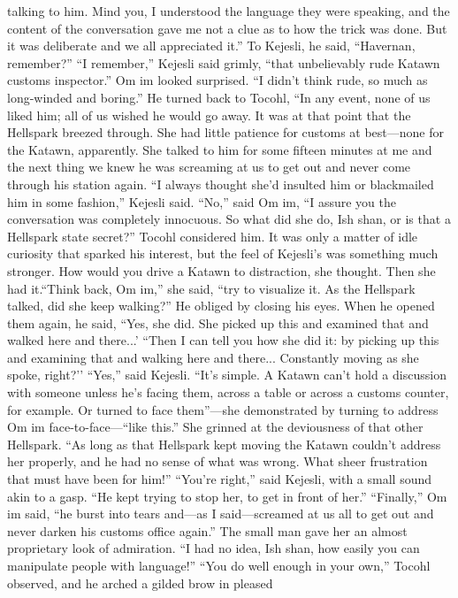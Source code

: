 \documentclass[9pt]{article}
\begin{document}
talking to him. Mind you, I understood the language they were speaking, and the content of the
conversation gave me not a clue as to how the trick was done. But it was deliberate and we all
appreciated it.” To Kejesli, he said, “Havernan, remember?”
“I remember,” Kejesli said grimly, “that unbelievably rude Katawn customs inspector.”
Om im looked surprised. “I didn’t think rude, so much as long-winded and boring.” He turned back
to Tocohl, “In any event, none of us liked him; all of us wished he would go away. It was at that point
that the Hellspark breezed through. She had little patience for customs at best—none for the Katawn,
apparently. She talked to him for some fifteen minutes at me and the next thing we knew he was
screaming at us to get out and never come through his station again.
“I always thought she’d insulted him or blackmailed him in some fashion,” Kejesli said.
“No,” said Om im, “I assure you the conversation was completely innocuous. So what did she do,
Ish shan, or is that a Hellspark state secret?”
Tocohl considered him. It was only a matter of idle curiosity that sparked his interest, but the feel of
Kejesli’s was something much stronger. How would you drive a Katawn to distraction, she thought.
Then she had it.“Think back, Om im,” she said, “try to visualize it. As the Hellspark talked, did she keep walking?”
He obliged by closing his eyes. When he opened them again, he said, “Yes, she did. She picked up
this and examined that and walked here and there...’
“Then I can tell you how she did it: by picking up this and examining that and walking here and
there... Constantly moving as she spoke, right?’’
“Yes,” said Kejesli.
“It’s simple. A Katawn can’t hold a discussion with someone unless he’s facing them, across a table
or across a customs counter, for example. Or turned to face them”—she demonstrated by turning to
address Om im face-to-face—“like this.”
She grinned at the deviousness of that other Hellspark. “As long as that Hellspark kept moving the
Katawn couldn’t address her properly, and he had no sense of what was wrong. What sheer frustration
that must have been for him!”
“You’re right,” said Kejesli, with a small sound akin to a gasp. “He kept trying to stop her, to get in
front of her.”
“Finally,” Om im said, “he burst into tears and—as I said—screamed at us all to get out and never
darken his customs office again.” The small man gave her an almost proprietary look of admiration. “I
had no idea, Ish shan, how easily you can manipulate people with language!”
“You do well enough in your own,” Tocohl observed, and he arched a gilded brow in pleased
\end{document}
